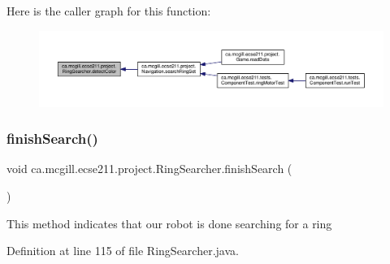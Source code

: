 Here is the caller graph for this function\+:\nopagebreak
\begin{figure}[H]
\begin{center}
\leavevmode
\includegraphics[width=350pt]{classca_1_1mcgill_1_1ecse211_1_1project_1_1_ring_searcher_a997bf874ae5577c48719254677830fb7_icgraph}
\end{center}
\end{figure}
\mbox{\label{classca_1_1mcgill_1_1ecse211_1_1project_1_1_ring_searcher_a6edfdbd31d9848ff885e2e4caa3b46c6}} 
\subsubsection{\texorpdfstring{finish\+Search()}{finishSearch()}}
{\footnotesize\ttfamily void ca.\+mcgill.\+ecse211.\+project.\+Ring\+Searcher.\+finish\+Search (\begin{DoxyParamCaption}{ }\end{DoxyParamCaption})}

This method indicates that our robot is done searching for a ring 

Definition at line 115 of file Ring\+Searcher.\+java.


